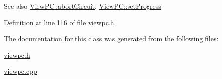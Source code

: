 \begin{DoxySeeAlso}{See also}
\hyperlink{class_view_p_c_ad7ba2fcf1d17862de15e32432823f7b0}{View\+P\+C\+::abort\+Circuit}, \hyperlink{class_view_p_c_a9c32a1fdb6ead84e5ada8fba8860c7ed}{View\+P\+C\+::set\+Progress} 
\end{DoxySeeAlso}


Definition at line \hyperlink{viewpc_8h_source_l00116}{116} of file \hyperlink{viewpc_8h_source}{viewpc.\+h}.



The documentation for this class was generated from the following files\+:\begin{DoxyCompactItemize}
\item 
\hyperlink{viewpc_8h}{viewpc.\+h}\item 
\hyperlink{viewpc_8cpp}{viewpc.\+cpp}\end{DoxyCompactItemize}
